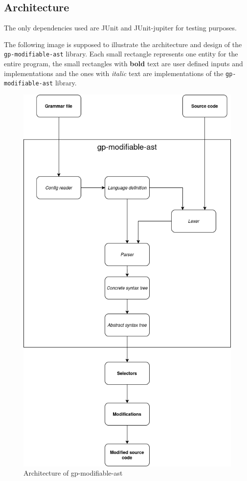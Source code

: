 \subsection{Architecture}

The only dependencies used are JUnit and JUnit-jupiter \cite{junit} for testing purposes.

The following image is supposed to illustrate the architecture and design of the \verb|gp-modifiable-ast| library.
Each small rectangle represents one entity for the entire program, the small rectangles with \textbf{bold} text are user defined inputs and implementations and
the ones with \textit{italic} text are implementations of the \verb|gp-modifiable-ast| library.


\begin{figure}[H]
    \centering
    \includegraphics[scale=0.40]{fig/architecture.png}
    \caption{Architecture of gp-modifiable-ast}
\end{figure}

